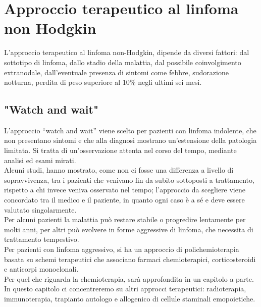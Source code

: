 \chapter{Approccio terapeutico al linfoma non Hodgkin}

L’approccio terapeutico al linfoma non-Hodgkin, dipende da diversi fattori: dal sottotipo di linfoma, 
dallo stadio della malattia, dal possibile coinvolgimento extranodale, dall’eventuale presenza di sintomi come febbre, 
sudorazione notturna, perdita di peso superiore al 10\% negli ultimi sei mesi\cite{LLS}.

\section{"Watch and wait"}
L’approccio “watch and wait” viene scelto per pazienti con linfoma indolente, che non presentano sintomi e che 
alla diagnosi mostrano un’estensione della patologia limitata. 
Si tratta di un’osservazione attenta nel corso del tempo, mediante analisi ed esami mirati\cite{LLS}.\\
Alcuni studi, hanno mostrato, come non ci fosse una differenza a livello di sopravvivenza, tra i pazienti che venivano 
fin da subito sottoposti a trattamento, rispetto a chi invece veniva osservato nel tempo; l’approccio da scegliere 
viene concordato tra il medico e il paziente, in quanto ogni caso è a sé e deve essere valutato singolarmente\cite{LLS}.\\
Per alcuni pazienti la malattia può restare stabile o progredire lentamente per molti anni, 
per altri può evolvere in forme aggressive di linfoma, che necessita di trattamento tempestivo.\\
Per pazienti con linfoma aggressivo, si ha un approccio di polichemioterapia basata su schemi terapeutici 
che associano farmaci chemioterapici, corticosteroidi e anticorpi monoclonali.\\ 
Per quel che riguarda la chemioterapia, sarà approfondita in un capitolo a parte.\\ 
In questo capitolo ci concentreremo su altri approcci terapeutici: 
radioterapia, immunoterapia, trapianto autologo e allogenico di cellule staminali emopoietiche.

